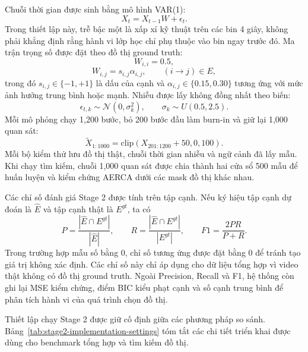 Chuỗi thời gian được sinh bằng mô hình VAR(1):
\begin{equation}
\label{eq:var1-generation}
    X_t = X_{t-1}W + \epsilon_t.
\end{equation}
Trong thiết lập này, trễ bậc một là xấp xỉ kỹ thuật trên các bin 4 giây, không phải khẳng định rằng hành vi lớp học chỉ phụ thuộc vào bin ngay trước đó. Ma trận trọng số được đặt theo đồ thị ground truth:
\begin{equation}
\label{eq:self-lag-weight}
    W_{i,i}=0.5,
\end{equation}
\begin{equation}
\label{eq:edge-weight-definition}
    W_{i,j}=s_{i,j}\alpha_{i,j},\qquad (i\rightarrow j)\in E,
\end{equation}
trong đó \(s_{i,j}\in\{-1,+1\}\) là dấu của cạnh và \(\alpha_{i,j}\in\{0.15,0.30\}\) tương ứng với mức ảnh hưởng trung bình hoặc mạnh. Nhiễu được lấy không đồng nhất theo biến:
\begin{equation}
\label{eq:noise-distribution}
    \epsilon_{t,k}\sim\mathcal{N}(0,\sigma_k^2),\qquad \sigma_k\sim U(0.5,2.5).
\end{equation}
Mỗi mô phỏng chạy 1,200 bước, bỏ 200 bước đầu làm burn-in và giữ lại 1,000 quan sát:
\begin{equation}
\label{eq:clipped-observations}
    \widetilde{X}_{1:1000}=\mathrm{clip}(X_{201:1200}+50,0,100).
\end{equation}
Mỗi bộ kiểm thử lưu đồ thị thật, chuỗi thời gian nhiễu và ngữ cảnh đã lấy mẫu. Khi chạy tìm kiếm, chuỗi 1,000 quan sát được chia thành hai cửa sổ 500 mẫu để huấn luyện và kiểm chứng AERCA dưới các mask đồ thị khác nhau.

Các chỉ số đánh giá Stage 2 được tính trên tập cạnh. Nếu ký hiệu tập cạnh dự đoán là \(\hat{E}\) và tập cạnh thật là \(E^{gt}\), ta có
\begin{equation}
\label{eq:graph-metrics}
    P=\frac{|\hat{E}\cap E^{gt}|}{|\hat{E}|}, \qquad
    R=\frac{|\hat{E}\cap E^{gt}|}{|E^{gt}|}, \qquad
    F1=\frac{2PR}{P+R}.
\end{equation}
Trong trường hợp mẫu số bằng 0, chỉ số tương ứng được đặt bằng 0 để tránh tạo giá trị không xác định. Các chỉ số này chỉ áp dụng cho dữ liệu tổng hợp vì video thật không có đồ thị ground truth. Ngoài Precision, Recall và F1, hệ thống còn ghi lại MSE kiểm chứng, điểm BIC kiểu phạt cạnh và số cạnh trung bình để phân tích hành vi của quá trình chọn đồ thị.

Thiết lập chạy Stage 2 được giữ cố định giữa các phương pháp so sánh. Bảng~\ref{tab:stage2-implementation-settings} tóm tắt các chi tiết triển khai được dùng cho benchmark tổng hợp và tìm kiếm đồ thị.

